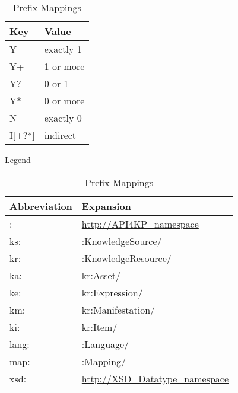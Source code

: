 \documentclass[runningheads]{llncs}
\begin{document}
\begin{table}[h]
\begin{minipage}[b]{0.45\linewidth}
\centering
\begin{tabular}{|l|l|}
\hline
\textbf{Key} & \textbf{Value} \\ \hline
Y            & exactly 1      \\ \hline
Y+           & 1 or more      \\ \hline
Y?           & 0 or 1         \\ \hline
Y*           & 0 or more      \\ \hline
N            & exactly 0      \\ \hline
I[+?*]       & indirect      \\ \hline
\end{tabular}
\caption{Legend}
\label{legend}
\end{minipage}
\hspace{0.5cm}
\begin{minipage}[b]{0.45\linewidth}
\centering
\begin{tabular}{|l|l|}
\hline
\textbf{Abbreviation} & \textbf{Expansion} \\ \hline
:            & \url{http://API4KP_namespace}      \\ \hline
ks:            & :KnowledgeSource/      \\ \hline
kr:            & :KnowledgeResource/      \\ \hline
ka:            & kr:Asset/      \\ \hline
ke:            & kr:Expression/      \\ \hline
km:            & kr:Manifestation/      \\ \hline
ki:            & kr:Item/      \\ \hline
lang:            & :Language/      \\ \hline
map:            & :Mapping/      \\ \hline
xsd:            & \url{http://XSD_Datatype_namespace }     \\ \hline
\end{tabular}
\caption{Prefix Mappings}
\label{abbreviations}
\end{minipage}
\end{table}
\end{document}
